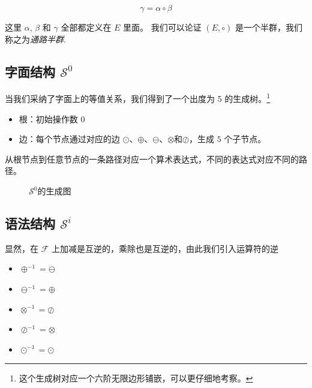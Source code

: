 \documentclass[a4paper,12pt]{article}
\numberwithin{definition}{section}
\numberwithin{lemma}{section}
\numberwithin{proposition}{section}
\numberwithin{theorem}{section}
\numberwithin{grammar}{section}
\numberwithin{program}{section}
\numberwithin{convention}{section}
\numberwithin{corollary}{section}
\begin{document}
$$\gamma = \alpha \circ \beta$$

这里 $\alpha$, $\beta$ 和 $\gamma$ 全部都定义在 $E$ 里面。 我们可以论证 $(E, \circ)$ 是一个半群，我们称之为\emph{通路半群}.

\subsection{字面结构 $\mathcal{S}^0$}\label{subsec:literial}

当我们采纳了字面上的等值关系，我们得到了一个出度为 5 的生成树。\footnote[2]{这个生成树对应一个六阶无限边形铺嵌，可以更仔细地考察。}

\begin{itemize}
    \item 根：初始操作数 $0$
    \item 边：每个节点通过对应的边 $\odot$、$\oplus$、$\ominus$、$\otimes$和$\oslash$，生成 $5$ 个子节点。
\end{itemize}

从根节点到任意节点的一条路径对应一个算术表达式，不同的表达式对应不同的路径。

\begin{figure}[ht]
\centering
{}
\caption{$\mathcal{S}^0$的生成图}
\end{figure}

\subsection{语法结构 $\mathcal{S}^i$}\label{subsec:syntactical}

显然，在 $\mathcal{F}$ 上加减是互逆的，乘除也是互逆的，由此我们引入运算符的逆
\begin{itemize}
    \item $\oplus^{-1} = \ominus$
    \item $\ominus^{-1} = \oplus$
    \item $\otimes^{-1} = \oslash$
    \item $\oslash^{-1} = \otimes$
    \item $\odot^{-1} = \odot$
\end{itemize}
\end{document}
